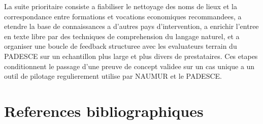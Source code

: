\documentclass[12pt,a4paper,twoside,openany]{report}
\begin{document}
La suite prioritaire consiste a fiabiliser le nettoyage des noms de lieux et la correspondance entre formations et vocations economiques recommandees, a etendre la base de connaissances a d'autres pays d'intervention, a enrichir l'entree en texte libre par des techniques de comprehension du langage naturel, et a organiser une boucle de feedback structuree avec les evaluateurs terrain du PADESCE sur un echantillon plus large et plus divers de prestataires. Ces etapes conditionnent le passage d'une preuve de concept validee sur un cas unique a un outil de pilotage regulierement utilise par NAUMUR et le PADESCE.

\newpage


\chapter*{References bibliographiques}
\end{document}
